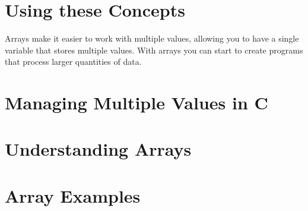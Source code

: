 







\clearpage
\section{Using these Concepts} %
\label{sec:arrays_using_these_concepts}

Arrays make it easier to work with multiple values, allowing you to have a single variable that stores multiple values. With arrays you can start to create programs that process larger quantities of data.





\clearpage
\def\pageLang{c}
\section{Managing Multiple Values in C} %
\label{sec:arrays_in_c}










\clearpage
\def\pageLang{none}
\section{Understanding Arrays} %
\label{sec:understanding_arrays}




\clearpage
\section{Array Examples} %
\label{sec:array_examples}

